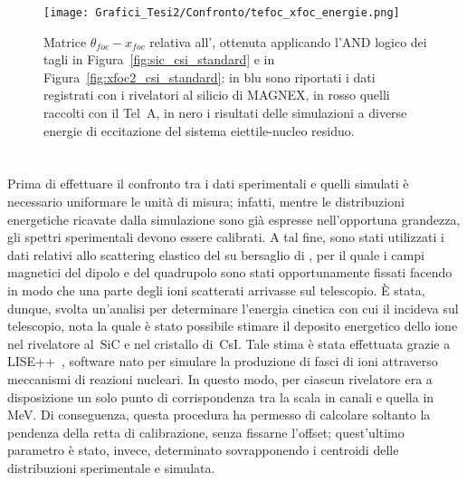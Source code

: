 \begin{figure} [!p]
	\centering
	\texttt{[image: Grafici\_Tesi2/Confronto/tefoc\_xfoc\_energie.png]}
	\caption{Matrice $\theta_{foc} - x_{foc}$ relativa all', ottenuta applicando l'AND logico dei tagli in Figura~\ref{fig:sic_csi_standard} e in Figura~\ref{fig:xfoc2_csi_standard}: in blu sono riportati i dati registrati con i rivelatori al silicio di MAGNEX, in rosso quelli raccolti con il Tel~A, in nero i risultati delle simulazioni a diverse energie di eccitazione del sistema eiettile-nucleo residuo.} \label{fig:tefoc_xfoc}
\end{figure}








\section{}




Prima di effettuare il confronto tra i dati sperimentali e quelli simulati è necessario uniformare le unità di misura; infatti, mentre le distribuzioni energetiche ricavate dalla simulazione sono già espresse nell'opportuna grandezza, gli spettri sperimentali devono essere calibrati.
A tal fine, sono stati utilizzati i dati relativi allo scattering elastico del  su bersaglio di , per il quale i campi magnetici del dipolo e del quadrupolo sono stati opportunamente fissati facendo in modo che una parte degli ioni scatterati arrivasse sul telescopio.
È stata, dunque, svolta un'analisi per determinare l'energia cinetica con cui il  incideva sul telescopio, nota la quale è stato possibile stimare il deposito energetico dello ione nel rivelatore al~SiC e nel cristallo di~CsI.
Tale stima è stata effettuata grazie a LISE++~\cite{tarasov:nimb08}, software nato per simulare la produzione di fasci di ioni attraverso meccanismi di reazioni nucleari.
In questo modo, per ciascun rivelatore era a disposizione un solo punto di corrispondenza tra la scala in canali e quella in MeV.
Di conseguenza, questa procedura ha permesso di calcolare soltanto la pendenza della retta di calibrazione, senza fissarne l'offset; quest'ultimo parametro è stato, invece, determinato sovrapponendo i centroidi delle distribuzioni sperimentale e simulata.

